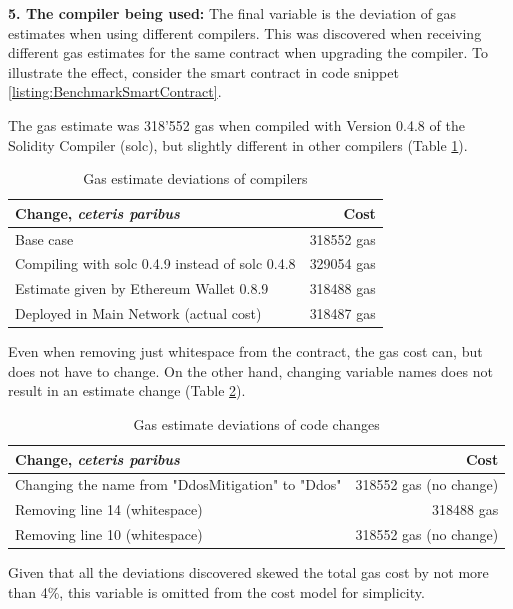 \textbf{5. The compiler being used:} The final variable is the deviation of gas estimates when using different compilers. This was discovered when receiving different gas estimates for the same contract when upgrading the compiler. To illustrate the effect, consider the smart contract in code snippet \ref{listing:BenchmarkSmartContract}.



The gas estimate was 318'552 gas when compiled with Version 0.4.8 of the Solidity Compiler (solc), but slightly different in other compilers (Table \ref{table:GasDeviations}).

\begin{table}
  \begin{center}
      \begin{tabular}{ l | r }
        \hline
        \textbf{Change, \textit{ceteris paribus}} & \textbf{Cost} \\ \hline
        Base case & 318552 gas \\ \hline
        Compiling with solc 0.4.9 instead of solc 0.4.8 & 329054 gas \\ \hline
        Estimate given by Ethereum Wallet 0.8.9 & 318488 gas \\ \hline
        Deployed in Main Network (actual cost) & 318487 gas \\
        \hline
      \end{tabular}
      \caption{Gas estimate deviations of compilers}
      \label{table:GasDeviations}
  \end{center}
\end{table}

Even when removing just whitespace from the contract, the gas cost can, but does not have to change. On the other hand, changing variable names does not result in an estimate change (Table \ref{table:GasDeviationsCode}).

\begin{table}
  \begin{center}
    \begin{tabular}{ l | r }
      \hline
      \textbf{Change, \textit{ceteris paribus}} & \textbf{Cost} \\ \hline
      Changing the name from "DdosMitigation" to "Ddos" & 318552 gas (no change) \\ \hline
      Removing line 14 (whitespace) & 318488 gas \\ \hline
      Removing line 10 (whitespace) & 318552 gas (no change) \\
      \hline
    \end{tabular}
    \caption{Gas estimate deviations of code changes}
    \label{table:GasDeviationsCode}
  \end{center}
\end{table}
Given that all the deviations discovered skewed the total gas cost by not more than 4\%, this variable is omitted from the cost model for simplicity.

